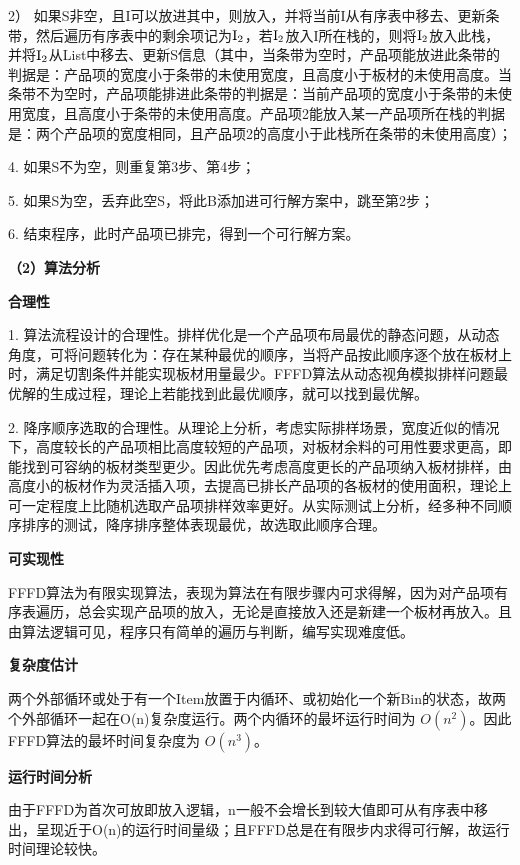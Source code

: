\documentclass[bwprint]{gmcmthesis}
\begin{document}
	2） 如果S非空，且I可以放进其中，则放入，并将当前I从有序表中移去、更新条带，然后遍历有序表中的剩余项记为$\rm{I}_2$，若$\rm{I}_2$放入I所在栈的，则将$\rm{I}_2$放入此栈，并将$\rm{I}_2$从List中移去、更新S信息（其中，当条带为空时，产品项能放进此条带的判据是：产品项的宽度小于条带的未使用宽度，且高度小于板材的未使用高度。当条带不为空时，产品项能排进此条带的判据是：当前产品项的宽度小于条带的未使用宽度，且高度小于条带的未使用高度。产品项2能放入某一产品项所在栈的判据是：两个产品项的宽度相同，且产品项2的高度小于此栈所在条带的未使用高度）；
	
	4. 如果S不为空，则重复第3步、第4步；
	
	5. 如果S为空，丢弃此空S，将此B添加进可行解方案中，跳至第2步；
	
	6. 结束程序，此时产品项已排完，得到一个可行解方案。
	
	
	\textbf{（2）算法分析}
	
	\textbf{合理性} 
	
	1. 算法流程设计的合理性。排样优化是一个产品项布局最优的静态问题，从动态角度，可将问题转化为：存在某种最优的顺序，当将产品按此顺序逐个放在板材上时，满足切割条件并能实现板材用量最少。FFFD算法从动态视角模拟排样问题最优解的生成过程，理论上若能找到此最优顺序，就可以找到最优解。
	
	2. 降序顺序选取的合理性。从理论上分析，考虑实际排样场景，宽度近似的情况下，高度较长的产品项相比高度较短的产品项，对板材余料的可用性要求更高，即能找到可容纳的板材类型更少。因此优先考虑高度更长的产品项纳入板材排样，由高度小的板材作为灵活插入项，去提高已排长产品项的各板材的使用面积，理论上可一定程度上比随机选取产品项排样效率更好。从实际测试上分析，经多种不同顺序排序的测试，降序排序整体表现最优，故选取此顺序合理。
	
	\textbf{可实现性}  
	
	FFFD算法为有限实现算法，表现为算法在有限步骤内可求得解，因为对产品项有序表遍历，总会实现产品项的放入，无论是直接放入还是新建一个板材再放入。且由算法逻辑可见，程序只有简单的遍历与判断，编写实现难度低。
	
	\textbf{复杂度估计}
	
	两个外部循环或处于有一个Item放置于内循环、或初始化一个新Bin的状态，故两个外部循环一起在O(n)复杂度运行。两个内循环的最坏运行时间为 $ O(n^2) $。因此FFFD算法的最坏时间复杂度为 $ O(n^3) $。
	
	\textbf{运行时间分析}
	 
	由于FFFD为首次可放即放入逻辑，n一般不会增长到较大值即可从有序表中移出，呈现近于O(n)的运行时间量级；且FFFD总是在有限步内求得可行解，故运行时间理论较快。
	
\end{document}
